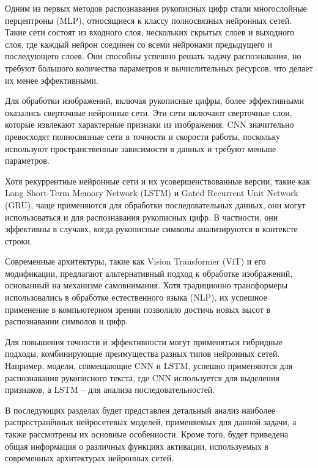 Одним из первых методов распознавания рукописных цифр стали многослойные 
перцептроны (MLP), относящиеся к классу полносвязных нейронных сетей. 
Такие сети состоят из входного слоя, нескольких скрытых слоев и выходного слоя, 
где каждый нейрон соединен со всеми нейронами предыдущего и последующего слоев. 
Они способны успешно решать задачу распознавания, но 
требуют большого количества параметров и вычислительных ресурсов, что делает 
их менее эффективными.

Для обработки изображений, включая рукописные цифры, более эффективными 
оказались сверточные нейронные сети. Эти сети включают сверточные слои, 
которые извлекают характерные признаки из изображения. CNN значительно 
превосходят полносвязные сети в точности и скорости работы, поскольку 
используют пространственные зависимости в данных и требуют меньше параметров.

Хотя рекуррентные нейронные сети и их усовершенствованные версии, такие 
как Long Short-Term Memory Network (LSTM) и Gated Recurrent Unit Network (GRU),
чаще применяются для обработки последовательных данных, они могут 
использоваться и для распознавания рукописных цифр. В частности, они 
эффективны в случаях, когда рукописные символы анализируются в контексте 
строки.

Современные архитектуры, такие как Vision Transformer (ViT) и его модификации, 
предлагают альтернативный подход к обработке изображений, основанный на 
механизме самовнимания. Хотя традиционно трансформеры использовались в 
обработке естественного языка (NLP), их успешное применение в компьютерном 
зрении позволило достичь новых высот в распознавании символов и цифр.

Для повышения точности и эффективности могут применяться гибридные подходы, 
комбинирующие преимущества разных типов нейронных сетей. Например, модели, 
совмещающие CNN и LSTM, успешно применяются для распознавания рукописного 
текста, где CNN используется для выделения признаков, а LSTM – для анализа 
последовательностей.

В последующих разделах будет представлен детальный анализ наиболее 
распространённых нейросетевых моделей, применяемых для данной задачи, а также 
рассмотрены их основные особенности. Кроме того, будет приведена общая 
информация о различных функциях активации, используемых в современных 
архитектурах нейронных сетей.


